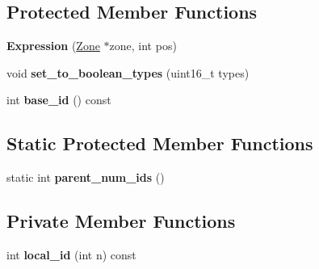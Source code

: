 \subsection*{Protected Member Functions}
\begin{DoxyCompactItemize}
\item 
{\bfseries Expression} (\hyperlink{classv8_1_1internal_1_1_zone}{Zone} $\ast$zone, int pos)\hypertarget{classv8_1_1internal_1_1_expression_a46d9647e4fed591b56c34685f53c6a1d}{}\label{classv8_1_1internal_1_1_expression_a46d9647e4fed591b56c34685f53c6a1d}

\item 
void {\bfseries set\+\_\+to\+\_\+boolean\+\_\+types} (uint16\+\_\+t types)\hypertarget{classv8_1_1internal_1_1_expression_ae9a7a32f16e66a890706367356df5122}{}\label{classv8_1_1internal_1_1_expression_ae9a7a32f16e66a890706367356df5122}

\item 
int {\bfseries base\+\_\+id} () const \hypertarget{classv8_1_1internal_1_1_expression_a0273a9bd52eabdc9e6514e24ca553d45}{}\label{classv8_1_1internal_1_1_expression_a0273a9bd52eabdc9e6514e24ca553d45}

\end{DoxyCompactItemize}
\subsection*{Static Protected Member Functions}
\begin{DoxyCompactItemize}
\item 
static int {\bfseries parent\+\_\+num\+\_\+ids} ()\hypertarget{classv8_1_1internal_1_1_expression_a545427a89e5742d706e53602d1de287e}{}\label{classv8_1_1internal_1_1_expression_a545427a89e5742d706e53602d1de287e}

\end{DoxyCompactItemize}
\subsection*{Private Member Functions}
\begin{DoxyCompactItemize}
\item 
int {\bfseries local\+\_\+id} (int n) const \hypertarget{classv8_1_1internal_1_1_expression_accd735ecb1aba1597bd72221f4c5d651}{}\label{classv8_1_1internal_1_1_expression_accd735ecb1aba1597bd72221f4c5d651}

\end{DoxyCompactItemize}
